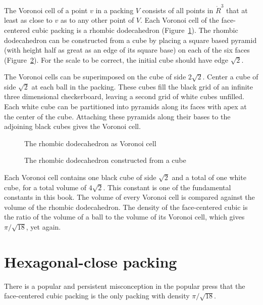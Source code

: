 The Voronoi cell of a point $v$ in a packing $V$ consists of all
points in $\ring{R}^3$ that at least as close to $v$ as to any other point
of $V$.  Each Voronoi cell of the face-centered cubic packing is a
rhombic dodecahedron (Figure~\ref{fig:rhombic}).  %
The rhombic dodecahedron can be constructed from a cube by placing a
square based pyramid (with height half as great as an edge of its
square base) on each of the six faces
(Figure~\ref{fig:rhombic-cube}).  %
For the scale to be correct, the initial cube should have edge
$\sqrt{2}$.

The Voronoi cells can be superimposed on the cube of side $2\sqrt2$.
Center a cube of side $\sqrt2$ at each ball in the packing. These
cubes fill the black grid of an infinite three dimensional
checkerboard, leaving a second grid of white cubes unfilled.  Each
white cube can be partitioned into pyramids along its faces with apex
at the center of the cube.  Attaching these pyramids along their bases
to the adjoining black cubes gives the Voronoi cell.

\begin{figure}[htb]
  \centering
  \caption{The rhombic dodecahedron as Voronoi cell}
  \label{fig:rhombic}
\end{figure}

\begin{figure}[htb]
  \centering
  \caption{The rhombic dodecahedron constructed from a cube}
  \label{fig:rhombic-cube}
\end{figure}

Each Voronoi cell contains one black cube of side $\sqrt2$ and a total
of one white cube, for a total volume of $4\sqrt2$.  This constant is
one of the fundamental constants in this book.  The volume of every
Voronoi cell is compared against the volume of the rhombic
dodecahedron.  The density of the face-centered cubic is the ratio of
the volume of a ball to the volume of its Voronoi cell, which gives
$\pi/\sqrt{18}$, yet again.





\section{Hexagonal-close packing}

There is a popular and persistent misconception in the popular press
that the face-centered cubic packing is the only packing with density
$\pi/\sqrt{18}$.

